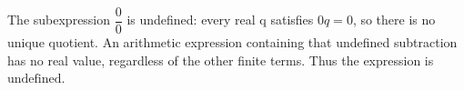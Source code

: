The subexpression $\dfrac{0}{0}$ is undefined: every real q satisfies $0q=0$, so there is no unique quotient. An arithmetic expression containing that undefined subtraction has no real value, regardless of the other finite terms. Thus the expression is $\boxed{\text{undefined}}$.
